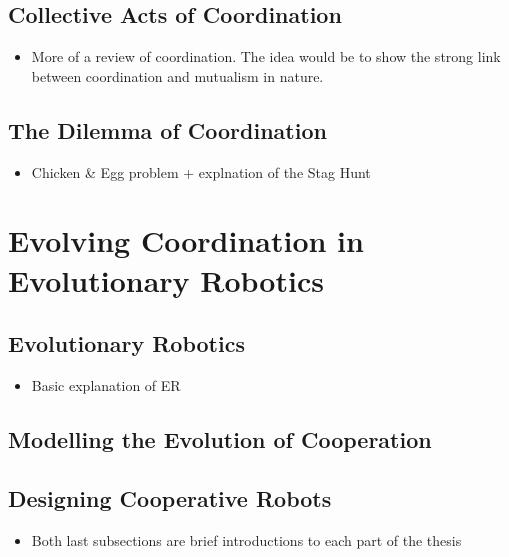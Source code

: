   \subsection{Collective Acts of Coordination}
    \begin{itemize}
      \item{More of a review of coordination. The idea would be to show the strong link between coordination and mutualism in nature.}
    \end{itemize}
  
  \subsection{The Dilemma of Coordination}
    \begin{itemize}
      \item{Chicken \& Egg problem + explnation of the Stag Hunt}
    \end{itemize}


\section{Evolving Coordination in Evolutionary Robotics}
  
  \subsection{Evolutionary Robotics}
    \begin{itemize}
      \item{Basic explanation of ER}
    \end{itemize}
  
  \subsection{Modelling the Evolution of Cooperation}

  \subsection{Designing Cooperative Robots}
    \begin{itemize}
      \item{Both last subsections are brief introductions to each part of the thesis}
    \end{itemize}
